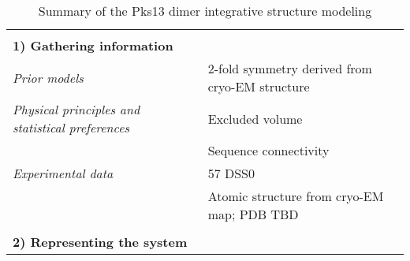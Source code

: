\documentclass[8pt,a4paper]{article}
\begin{document}
\setcounter{table}{8}

\begin{longtable}{ p{} | p{} } 
\caption{Summary of the Pks13 dimer integrative structure modeling}
  
  &  \\
  \textbf{1) Gathering information} & \\
    \hline

            \textit{Prior models} & 2-fold symmetry derived from cryo-EM structure\\
                \textit{Physical principles and statistical preferences} & Excluded volume\\
            & Sequence connectivity \\
                \textit{Experimental data} & 57 DSS0\\
            & Atomic structure from cryo-EM map; PDB TBD \\
          
    &  \\
    \normalsize{\textbf{2) Representing the system}} & \\
    \hline
    

\end{longtable}
\end{document}
